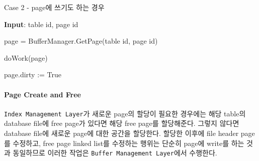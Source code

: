 \documentclass[main.tex]{subfiles}
\begin{document}
\begin{algorithm}[!hbt]
	\caption{Case 2 - page에 쓰기도 하는 경우}
	
	\hspace*{8pt} \textbf{Input}: table id, page id\\
	
	\begin{algorithmic}
		\State page = BufferManager.GetPage(table id, page id)
		
		\State doWork(page)
		
		\State page.dirty := True
	\end{algorithmic}
\end{algorithm}


\paragraph{Page Create and Free}
\texttt{Index Management Layer}가 새로운 page의 할당이 필요한 경우에는 해당 table의 database file에 free page가 있다면 해당 free page를 할당해준다. 그렇지 않다면 database file에 새로운 page에 대한 공간을 할당한다. 할당한 이후에 file header page를 수정하고, free page linked list를 수정하는 행위는 단순히 page에 write를 하는 것과 동일하므로 이러한 작업은 \texttt{Buffer Management Layer}에서 수행한다.
\end{document}
